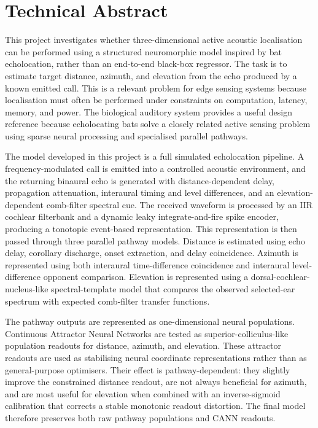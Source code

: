 \chapter*{Technical Abstract}

This project investigates whether three-dimensional active acoustic localisation can be performed using a structured neuromorphic model inspired by bat echolocation, rather than an end-to-end black-box regressor. The task is to estimate target distance, azimuth, and elevation from the echo produced by a known emitted call. This is a relevant problem for edge sensing systems because localisation must often be performed under constraints on computation, latency, memory, and power. The biological auditory system provides a useful design reference because echolocating bats solve a closely related active sensing problem using sparse neural processing and specialised parallel pathways.

The model developed in this project is a full simulated echolocation pipeline. A frequency-modulated call is emitted into a controlled acoustic environment, and the returning binaural echo is generated with distance-dependent delay, propagation attenuation, interaural timing and level differences, and an elevation-dependent comb-filter spectral cue. The received waveform is processed by an IIR cochlear filterbank and a dynamic leaky integrate-and-fire spike encoder, producing a tonotopic event-based representation. This representation is then passed through three parallel pathway models. Distance is estimated using echo delay, corollary discharge, onset extraction, and delay coincidence. Azimuth is represented using both interaural time-difference coincidence and interaural level-difference opponent comparison. Elevation is represented using a dorsal-cochlear-nucleus-like spectral-template model that compares the observed selected-ear spectrum with expected comb-filter transfer functions.

The pathway outputs are represented as one-dimensional neural populations. Continuous Attractor Neural Networks are tested as superior-colliculus-like population readouts for distance, azimuth, and elevation. These attractor readouts are used as stabilising neural coordinate representations rather than as general-purpose optimisers. Their effect is pathway-dependent: they slightly improve the constrained distance readout, are not always beneficial for azimuth, and are most useful for elevation when combined with an inverse-sigmoid calibration that corrects a stable monotonic readout distortion. The final model therefore preserves both raw pathway populations and CANN readouts.

